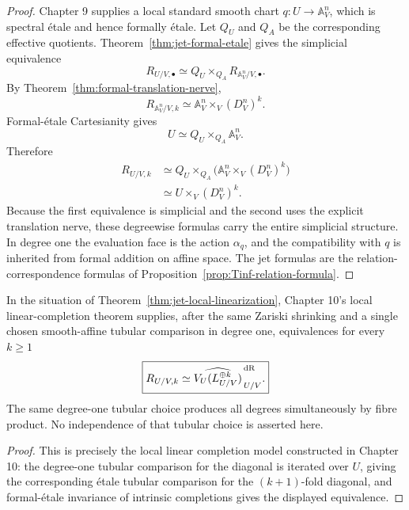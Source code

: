 \begin{proof}
Chapter 9 supplies a local standard smooth chart $q:U\to\mathbb A^n_V$, which is spectral \'{e}tale and hence formally \'{e}tale.  Let $Q_U$ and $Q_A$ be the corresponding effective quotients.  Theorem~\ref{thm:jet-formal-etale} gives the simplicial equivalence
\[
    R_{U/V,\bullet}
    \simeq
    Q_U\times_{Q_A}R_{\mathbb A^n_V/V,\bullet}.
\]
By Theorem~\ref{thm:formal-translation-nerve},
\[
    R_{\mathbb A^n_V/V,k}
    \simeq
    \mathbb A^n_V\times_V(D^n_V)^k.
\]
Formal-\'{e}tale Cartesianity gives
\[
    U\simeq Q_U\times_{Q_A}\mathbb A^n_V.
\]
Therefore
\[
\begin{aligned}
R_{U/V,k}
&\simeq
Q_U\times_{Q_A}
\bigl(\mathbb A^n_V\times_V(D^n_V)^k\bigr)\\
&\simeq
U\times_V(D^n_V)^k.
\end{aligned}
\]
Because the first equivalence is simplicial and the second uses the explicit translation nerve, these degreewise formulas carry the entire simplicial structure.  In degree one the evaluation face is the action $\alpha_q$, and the compatibility with $q$ is inherited from formal addition on affine space.  The jet formulas are the relation-correspondence formulas of Proposition~\ref{prop:Tinf-relation-formula}.
\end{proof}

\begin{corollary}
\label{thm:jet-tubular-linear-model}
In the situation of Theorem~\ref{thm:jet-local-linearization}, Chapter 10's local linear-completion theorem supplies, after the same Zariski shrinking and a single chosen smooth-affine tubular comparison in degree one, equivalences for every $k\geq1$
\[
\boxed{
    R_{U/V,k}
    \simeq
    \widehat{V_U(L_{U/V}^{\oplus k})}^{\,\mathrm{dR}}_{\,U/V}.
}
\]
The same degree-one tubular choice produces all degrees simultaneously by fibre product.  No independence of that tubular choice is asserted here.
\end{corollary}

\begin{proof}
This is precisely the local linear completion model constructed in Chapter 10: the degree-one tubular comparison for the diagonal is iterated over $U$, giving the corresponding \'{e}tale tubular comparison for the $(k+1)$-fold diagonal, and formal-\'{e}tale invariance of intrinsic completions gives the displayed equivalence.
\end{proof}

